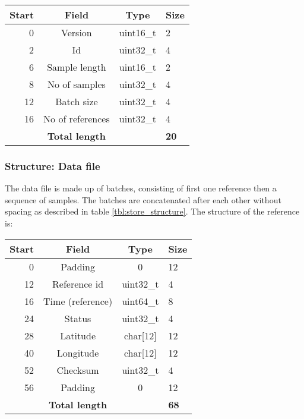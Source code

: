 \documentclass[a4paper]{article}
\begin{document}
\begin{multicols}{2}
  \begin{tabular}{|r|c|c|l|}
    \hline
    \bfseries Start    &     \bfseries Field     & \bfseries  Type
    &   \bfseries Size  \\ \hline
    0   & Version   & uint16\_t   & 2 \\ \hline
    2   & Id        & uint32\_t   & 4 \\ \hline
    6   & Sample length & uint16\_t & 2 \\ \hline
    8   & No of samples   & uint32\_t   & 4 \\ \hline
    12  & Batch size & uint32\_t  & 4 \\ \hline
    16  & No of references & uint32\_t & 4 \\ \hline
    & \textbf{Total length} &  & \textbf{20} \\ \hline
  \end{tabular}
  \label{tab:index_binary_fields}

  \subsubsection{Structure: Data file}
  The data file is made up of batches, consisting of first one reference
  then a sequence of samples. The batches are concatenated after each
  other without spacing as described in table \ref{tbl:store_structure}.
  The structure of the reference is:
  \vspace{1em}

  \begin{tabular}{|r|c|c|l|}
    \hline
    \bfseries Start   &     \bfseries Field     &   \bfseries Type
    &   \bfseries Size  \\ \hline
    0   & Padding           & 0           & 12 \\ \hline
    12  & Reference id      & uint32\_t   & 4 \\ \hline
    16  & Time (reference)  & uint64\_t   & 8 \\ \hline
    24  & Status            & uint32\_t   & 4 \\ \hline
    28  & Latitude          & char[12]    & 12 \\ \hline
    40  & Longitude         & char[12]    & 12 \\ \hline
    52  & Checksum          & uint32\_t   & 4 \\ \hline
    56  & Padding           & 0           & 12  \\ \hline
    & \textbf{Total length} &  & \textbf{68} \\ \hline
  \end{tabular}
  \label{tab:reference_binary_fields}


\end{multicols}
\end{document}
